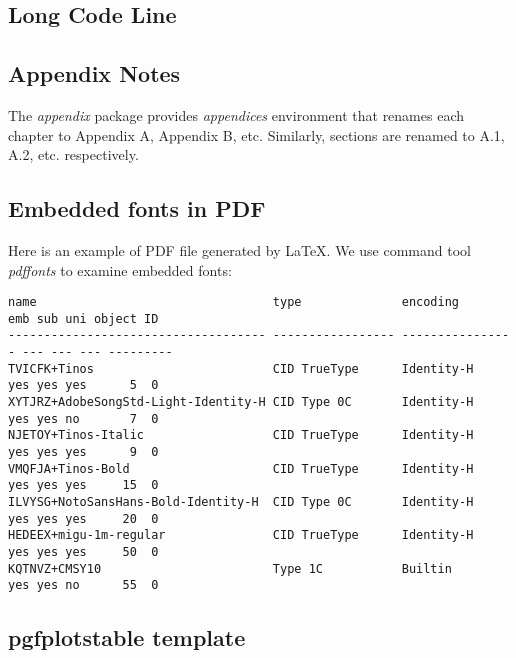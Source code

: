 \begin{appendices}

\chapter{Long Code Line}
\label{cha:long-code-line}

\section{Appendix Notes}
\label{cha:appendix-notes}

The \textit{appendix} package provides \textit{appendices}
environment that renames each chapter to Appendix A, Appendix B,
etc. Similarly, sections are renamed to A.1, A.2,
etc. respectively.

\section{Embedded fonts in PDF}
\label{sec:pdffonts}

Here is an example of PDF file generated by \LaTeX{}. We use
command tool \textit{pdffonts} to examine embedded fonts:

\begin{lstlisting}[language={},caption={\LaTeX{} 内嵌字体},label={pdffonts},frame={tb},basicstyle=\tiny\ttfamily,linewidth=.88\textwidth]
name                                 type              encoding         emb sub uni object ID
------------------------------------ ----------------- ---------------- --- --- --- ---------
TVICFK+Tinos                         CID TrueType      Identity-H       yes yes yes      5  0
XYTJRZ+AdobeSongStd-Light-Identity-H CID Type 0C       Identity-H       yes yes no       7  0
NJETOY+Tinos-Italic                  CID TrueType      Identity-H       yes yes yes      9  0
VMQFJA+Tinos-Bold                    CID TrueType      Identity-H       yes yes yes     15  0
ILVYSG+NotoSansHans-Bold-Identity-H  CID Type 0C       Identity-H       yes yes yes     20  0
HEDEEX+migu-1m-regular               CID TrueType      Identity-H       yes yes yes     50  0
KQTNVZ+CMSY10                        Type 1C           Builtin          yes yes no      55  0
\end{lstlisting}  

\section{pgfplotstable template}
\label{sec:pgfplotstable-template}


\end{appendices}
